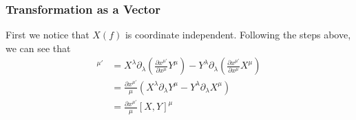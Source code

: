 \subsubsection{Transformation as a Vector}
First we notice that $X(f)$ is coordinate independent. Following the steps above, we can see that
\begin{align}
    [X,Y]^{\mu'} &= X^\lambda\partial_\lambda\left( \frac{\partial x^{\mu'}}{\partial x^\mu} Y^\mu\right) - Y^\lambda\partial_\lambda\left( \frac{\partial x^{\mu'}}{\partial x^\mu} X^\mu\right) \\
    &= \frac{\partial x^{\mu'}}{\mu} \left(X^\lambda \partial_\lambda Y^\mu - Y^\lambda\partial_\lambda X^\mu \right) \\
    &= \frac{\partial x^{\mu'}}{\mu} [X,Y]^\mu
\end{align}

